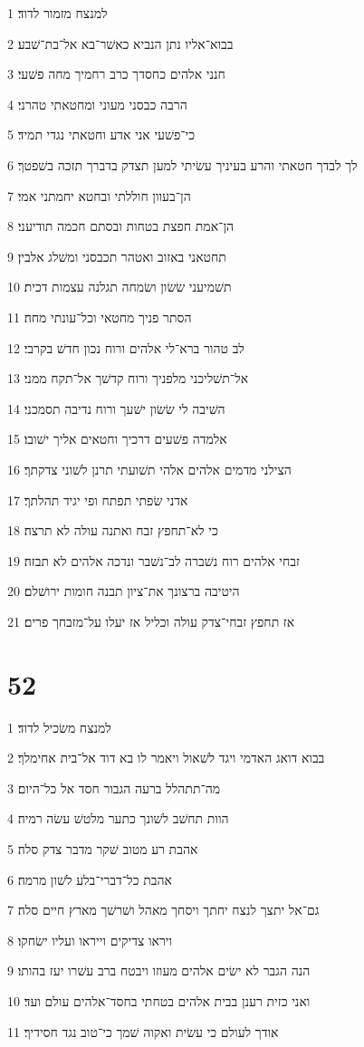 \par 1 למנצח מזמור לדוד׃
\par 2 בבוא־אליו נתן הנביא כאשׁר־בא אל־בת־שׁבע׃
\par 3 חנני אלהים כחסדך כרב רחמיך מחה פשׁעי׃
\par 4 הרבה כבסני מעוני ומחטאתי טהרני׃
\par 5 כי־פשׁעי אני אדע וחטאתי נגדי תמיד׃
\par 6 לך לבדך חטאתי והרע בעיניך עשׂיתי למען תצדק בדברך תזכה בשׁפטך׃
\par 7 הן־בעוון חוללתי ובחטא יחמתני אמי׃
\par 8 הן־אמת חפצת בטחות ובסתם חכמה תודיעני׃
\par 9 תחטאני באזוב ואטהר תכבסני ומשׁלג אלבין׃
\par 10 תשׁמיעני שׂשׂון ושׂמחה תגלנה עצמות דכית׃
\par 11 הסתר פניך מחטאי וכל־עונתי מחה׃
\par 12 לב טהור ברא־לי אלהים ורוח נכון חדשׁ בקרבי׃
\par 13 אל־תשׁליכני מלפניך ורוח קדשׁך אל־תקח ממני׃
\par 14 השׁיבה לי שׂשׂון ישׁעך ורוח נדיבה תסמכני׃
\par 15 אלמדה פשׁעים דרכיך וחטאים אליך ישׁובו׃
\par 16 הצילני מדמים אלהים אלהי תשׁועתי תרנן לשׁוני צדקתך׃
\par 17 אדני שׂפתי תפתח ופי יגיד תהלתך׃
\par 18 כי לא־תחפץ זבח ואתנה עולה לא תרצה׃
\par 19 זבחי אלהים רוח נשׁברה לב־נשׁבר ונדכה אלהים לא תבזה׃
\par 20 היטיבה ברצונך את־ציון תבנה חומות ירושׁלם׃
\par 21 אז תחפץ זבחי־צדק עולה וכליל אז יעלו על־מזבחך פרים׃

\chapter{52}

\par 1 למנצח משׂכיל לדוד׃
\par 2 בבוא דואג האדמי ויגד לשׁאול ויאמר לו בא דוד אל־בית אחימלך׃
\par 3 מה־תתהלל ברעה הגבור חסד אל כל־היום׃
\par 4 הוות תחשׁב לשׁונך כתער מלטשׁ עשׂה רמיה׃
\par 5 אהבת רע מטוב שׁקר מדבר צדק סלה׃
\par 6 אהבת כל־דברי־בלע לשׁון מרמה׃
\par 7 גם־אל יתצך לנצח יחתך ויסחך מאהל ושׁרשׁך מארץ חיים סלה׃
\par 8 ויראו צדיקים וייראו ועליו ישׂחקו׃
\par 9 הנה הגבר לא ישׂים אלהים מעוזו ויבטח ברב עשׁרו יעז בהותו׃
\par 10 ואני כזית רענן בבית אלהים בטחתי בחסד־אלהים עולם ועד׃
\par 11 אודך לעולם כי עשׂית ואקוה שׁמך כי־טוב נגד חסידיך׃

